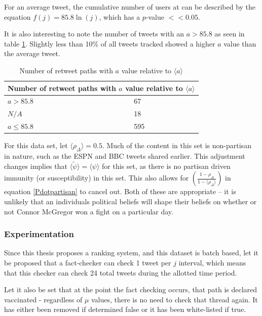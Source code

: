 \documentclass[preprint,review,12pt]{elsarticle}
\begin{document}
For an average tweet, the cumulative number of users at can be described by the equation $f(j)=85.8\ln(j)$, which has a $p$-value $<< 0.05$. 

It is also interesting to note the number of tweets with an $a > 85.8$ as seen in table \ref{a > 85.58}. Slightly less than 10\% of all tweets tracked showed a higher $a$ value than the average tweet.
\begin{table}[h!]
\centering
\begin{tabular}{ |p{3cm}|p{3cm}|  }
\hline
\multicolumn{2}{|c|}{Number of retweet paths with $a$ value relative to $\langle a \rangle$} \\
\hline
$a > 85.8$  & 67\\
$N/A$ & 18 \\
$ a \leq 85.8$ & 595 \\
\hline
\end{tabular}
\caption{Number of retweet paths with $a$ value relative to $\langle a \rangle$}
\label{a > 85.58}
\end{table}


For this data set, let $\langle \rho_{\Delta} \rangle = 0.5$. Much of the content in this set is non-partisan in nature, such as the ESPN and BBC tweets shared earlier. This adjustment changes implies that $\langle \tilde{\psi} \rangle = \langle \psi \rangle$ for this set, as there is no partisan driven immunity (or susceptibility) in this set. This also allows for 
$\left(\frac{1-\rho_{\Delta}}{1-\langle\rho_{\Delta}\rangle}\right)$ in equation \ref{Pdotpartisan} to cancel out. Both of these are appropriate -- it is unlikely that an individuals political beliefs will shape their beliefs on whether or not Connor McGregor won a fight on a particular day. 

\subsubsection{Experimentation}
\label{sec: Twitter15 Experimentation}
Since this thesis proposes a ranking system, and this dataset is batch based, let it be proposed that a fact-checker can check 1 tweet per $j$ interval, which means that this checker can check 24 total tweets during the allotted time period.

Let it also be set that at the point the fact checking occurs, that path is declared vaccinated - regardless of $\mu$ values, there is no need to check that thread again. It has either been removed if determined false or it has been white-listed if true.
\end{document}
